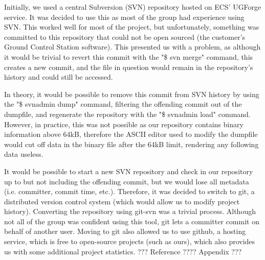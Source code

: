 Initially, we used a central Subversion (SVN) repository hosted on ECS' 
UGForge service. It was decided to use this as most of the group had 
experience using SVN. This worked well for most of the project, but 
unfortunately, something was committed to this repository that could not be 
open sourced (the customer's Ground Control Station software). This presented 
us with a problem, as although it would be trivial to revert this commit with 
the "\$ svn merge" command, this creates a new commit, and the file in 
question would remain in the repository's history and could still be accessed.

In theory, it would be possible to remove this commit from SVN history by 
using the "\$ svnadmin dump" command, filtering the offending commit out of 
the dumpfile, and regenerate the repository with the "\$ svnadmin load" 
command. However, in practice, this was not possible as our repository 
contains binary information above 64kB, therefore the ASCII editor used to 
modify the dumpfile would cut off data in the binary file after the 64kB 
limit, rendering any following data useless.

It would be possible to start a new SVN repository and check in our 
repository up to but not including the offending commit, but we would lose 
all metadata (i.e. committer, commit time, etc.). Therefore, it was decided to 
switch to git, a distributed version control system (which would allow us to 
modify project history). Converting the repository using git-svn was a trivial 
process. Although not all of the group was confident using this tool, git 
lets a committer commit on behalf of another user. Moving to git also 
allowed us to use github, a hosting service, which is free to open-source 
projects (such as ours), which also provides us with some additional 
project statistics. ??? Reference ???? Appendix ???

